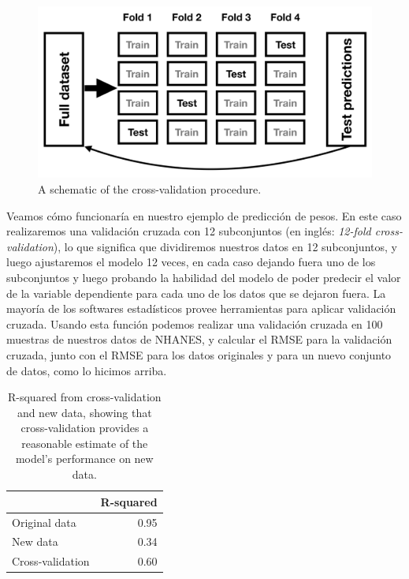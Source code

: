 \documentclass[
  12pt,
]{book}
\begin{document}
\begin{figure}
\includegraphics[height=0.3\textheight]{images/crossvalidation} \caption{A schematic of the  cross-validation procedure.}\label{fig:crossvalidation}
\end{figure}

Veamos cómo funcionaría en nuestro ejemplo de predicción de pesos. En este caso realizaremos una validación cruzada con 12 subconjuntos (en inglés: \emph{12-fold cross-validation}), lo que significa que dividiremos nuestros datos en 12 subconjuntos, y luego ajustaremos el modelo 12 veces, en cada caso dejando fuera uno de los subconjuntos y luego probando la habilidad del modelo de poder predecir el valor de la variable dependiente para cada uno de los datos que se dejaron fuera. La mayoría de los softwares estadísticos provee herramientas para aplicar validación cruzada. Usando esta función podemos realizar una validación cruzada en 100 muestras de nuestros datos de NHANES, y calcular el RMSE para la validación cruzada, junto con el RMSE para los datos originales y para un nuevo conjunto de datos, como lo hicimos arriba.

\begin{table}

\caption{\label{tab:unnamed-chunk-106}R-squared from cross-validation and new data, showing that cross-validation provides a reasonable estimate of the model's performance on new data.}
\centering
\begin{tabular}[t]{l|r}
\hline
  & R-squared\\
\hline
Original data & 0.95\\
\hline
New data & 0.34\\
\hline
Cross-validation & 0.60\\
\hline
\end{tabular}
\end{table}
\end{document}
